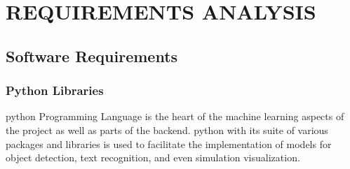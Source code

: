 ﻿\chapter{REQUIREMENTS ANALYSIS}

\section{Software Requirements}

\subsection{Python Libraries}

\gls{python} Programming Language is the heart of the machine learning aspects of the project as well as parts of the backend. \gls{python} with its suite of various packages and libraries is used to facilitate the implementation of models for object detection, text recognition, and even simulation visualization.

